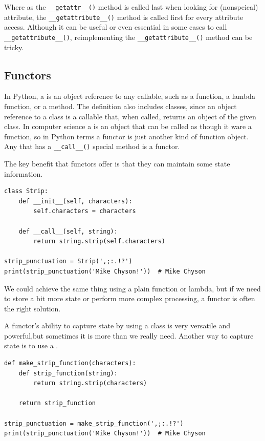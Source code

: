 Where as the \verb|__getattr__()| method is called last when looking for (nonspeical) attribute, the \verb|__getattribute__()| method is called first for every attribute access.
Although it can be useful or even essential in some cases to call \verb|__getattribute__()|, reimplementing the \verb|__getattribute__()| method can be tricky.


\subsection{Functors}

In Python, a  is an object reference to any callable, such as a function, a lambda function, or a method.
The definition also includes classes, since an object reference to a class is a callable that, when called, returns an object of the given class.
In computer science a  is an object that can be called as though it ware a function, so in Python terms a functor is just another kind of function object.
Any  that has a \verb|__call__()| special method is a functor.



The key benefit that functors offer is that they can maintain some state information.
\begin{lstlisting}
class Strip:
    def __init__(self, characters):
        self.characters = characters

    def __call__(self, string):
        return string.strip(self.characters)
  
strip_punctuation = Strip(',;:.!?')
print(strip_punctuation('Mike Chyson!'))  # Mike Chyson
\end{lstlisting}

We could achieve the same thing using a plain function or lambda, but if we need to store a bit more state or perform more complex processing, a functor is often the right solution.



A functor’s ability to capture state by using a class is very versatile and powerful,but sometimes it is more than we really need.
Another way to capture state is to use a .

\begin{lstlisting}
def make_strip_function(characters):
    def strip_function(string):
        return string.strip(characters)

    return strip_function  

strip_punctuation = make_strip_function(',;:.!?')
print(strip_punctuation('Mike Chyson!'))  # Mike Chyson

\end{lstlisting}

